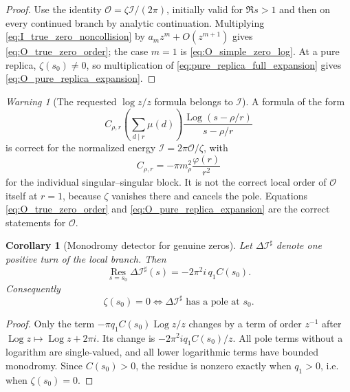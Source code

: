 \documentclass[11pt]{amsart}
\numberwithin{equation}{section}
\theoremstyle{plain}
\newtheorem{corollary}[theorem]{Corollary}
\theoremstyle{definition}
\theoremstyle{remark}
\newtheorem{warning}[theorem]{Warning}
\newcommand{\Log}{\operatorname{Log}}
\begin{document}
\begin{proof}
Use the identity
\(\mathcal O=\zeta\mathcal I/(2\pi)\), initially valid for \(\Re s>1\)
and then on every continued branch by analytic continuation.  Multiplying
\eqref{eq:I_true_zero_noncollision} by
\(a_mz^m+O(z^{m+1})\) gives \eqref{eq:O_true_zero_order}; the case \(m=1\)
is \eqref{eq:O_simple_zero_log}.  At a pure replica, \(\zeta(s_0)\ne0\), so
multiplication of \eqref{eq:pure_replica_full_expansion} gives
\eqref{eq:O_pure_replica_expansion}.
\end{proof}

\begin{warning}[The requested \(\log z/z\) formula belongs to \(\mathcal I\)]
\label{warn:requested_formula_normalization}
A formula of the form
\begin{equation}
C_{\rho,r}
\left(\sum_{d\mid r}\mu(d)\right)
\frac{\Log(s-\rho/r)}{s-\rho/r}
\label{eq:requested_formula_shape}
\end{equation}
is correct for the normalized energy \(\mathcal I=2\pi\mathcal O/\zeta\),
with
\begin{equation}
C_{\rho,r}
=-\pi m_\rho^2\frac{\varphi(r)}{r^2}
\label{eq:C_rho_r_requested}
\end{equation}
for the individual singular--singular block.  It is not the correct local
order of \(\mathcal O\) itself at \(r=1\), because \(\zeta\) vanishes there
and cancels the pole.  Equations \eqref{eq:O_true_zero_order} and
\eqref{eq:O_pure_replica_expansion} are the correct statements for
\(\mathcal O\).
\end{warning}

\begin{corollary}[Monodromy detector for genuine zeros]
\label{cor:monodromy_zero_detector}
Let \(\Delta\mathcal I^\sharp\) denote one positive turn of the local branch.
Then
\begin{equation}
\operatorname*{Res}_{s=s_0}\Delta\mathcal I^\sharp(s)
=
-2\pi^2 i\,q_1C(s_0).
\label{eq:monodromy_residue_general}
\end{equation}
Consequently
\begin{equation}
\boxed{
\zeta(s_0)=0
\iff
\Delta\mathcal I^\sharp
\text{ has a pole at }s_0.}
\label{eq:monodromy_detector_equivalence}
\end{equation}
\end{corollary}

\begin{proof}
Only the term \(-\pi q_1C(s_0)\Log z/z\) changes by a term of order
\(z^{-1}\) after \(\Log z\mapsto\Log z+2\pi i\).  Its change is
\(-2\pi^2i q_1C(s_0)/z\).  All pole terms without a logarithm are
single-valued, and all lower logarithmic terms have bounded monodromy.  Since
\(C(s_0)>0\), the residue is nonzero exactly when \(q_1>0\), i.e. when
\(\zeta(s_0)=0\).
\end{proof}
\end{document}
